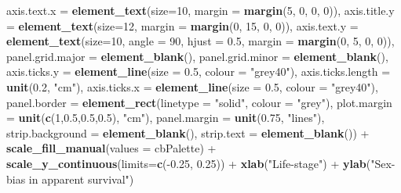 \documentclass[]{article}
\newenvironment{Shaded}{\begin{snugshade}}{\end{snugshade}}
\newcommand{\KeywordTok}[1]{\textcolor[rgb]{0.13,0.29,0.53}{\textbf{{#1}}}}
\newcommand{\DataTypeTok}[1]{\textcolor[rgb]{0.13,0.29,0.53}{{#1}}}
\newcommand{\DecValTok}[1]{\textcolor[rgb]{0.00,0.00,0.81}{{#1}}}
\newcommand{\FloatTok}[1]{\textcolor[rgb]{0.00,0.00,0.81}{{#1}}}
\newcommand{\StringTok}[1]{\textcolor[rgb]{0.31,0.60,0.02}{{#1}}}
\newcommand{\NormalTok}[1]{{#1}}
\begin{document}
\begin{Shaded}
\begin{Highlighting}[]
                      \DataTypeTok{axis.text.x  =} \KeywordTok{element_text}\NormalTok{(}\DataTypeTok{size=}\DecValTok{10}\NormalTok{, }\DataTypeTok{margin =} \KeywordTok{margin}\NormalTok{(}\DecValTok{5}\NormalTok{, }\DecValTok{0}\NormalTok{, }\DecValTok{0}\NormalTok{, }\DecValTok{0}\NormalTok{)), }
                      \DataTypeTok{axis.title.y =} \KeywordTok{element_text}\NormalTok{(}\DataTypeTok{size=}\DecValTok{12}\NormalTok{, }\DataTypeTok{margin =} \KeywordTok{margin}\NormalTok{(}\DecValTok{0}\NormalTok{, }\DecValTok{15}\NormalTok{, }\DecValTok{0}\NormalTok{, }\DecValTok{0}\NormalTok{)),}
                      \DataTypeTok{axis.text.y  =} \KeywordTok{element_text}\NormalTok{(}\DataTypeTok{size=}\DecValTok{10}\NormalTok{, }\DataTypeTok{angle =} \DecValTok{90}\NormalTok{, }\DataTypeTok{hjust =} \FloatTok{0.5}\NormalTok{, }
                                                  \DataTypeTok{margin =} \KeywordTok{margin}\NormalTok{(}\DecValTok{0}\NormalTok{, }\DecValTok{5}\NormalTok{, }\DecValTok{0}\NormalTok{, }\DecValTok{0}\NormalTok{)),}
                      \DataTypeTok{panel.grid.major =} \KeywordTok{element_blank}\NormalTok{(),}
                      \DataTypeTok{panel.grid.minor =} \KeywordTok{element_blank}\NormalTok{(),}
                      \DataTypeTok{axis.ticks.y =} \KeywordTok{element_line}\NormalTok{(}\DataTypeTok{size =} \FloatTok{0.5}\NormalTok{, }\DataTypeTok{colour =} \StringTok{"grey40"}\NormalTok{),}
                      \DataTypeTok{axis.ticks.length =} \KeywordTok{unit}\NormalTok{(}\FloatTok{0.2}\NormalTok{, }\StringTok{"cm"}\NormalTok{),}
                      \DataTypeTok{axis.ticks.x =} \KeywordTok{element_line}\NormalTok{(}\DataTypeTok{size =} \FloatTok{0.5}\NormalTok{, }\DataTypeTok{colour =} \StringTok{"grey40"}\NormalTok{),}
                      \DataTypeTok{panel.border =} \KeywordTok{element_rect}\NormalTok{(}\DataTypeTok{linetype =} \StringTok{"solid"}\NormalTok{, }\DataTypeTok{colour =} \StringTok{"grey"}\NormalTok{),}
                      \DataTypeTok{plot.margin =} \KeywordTok{unit}\NormalTok{(}\KeywordTok{c}\NormalTok{(}\DecValTok{1}\NormalTok{,}\FloatTok{0.5}\NormalTok{,}\FloatTok{0.5}\NormalTok{,}\FloatTok{0.5}\NormalTok{), }\StringTok{"cm"}\NormalTok{),}
                      \DataTypeTok{panel.margin =} \KeywordTok{unit}\NormalTok{(}\FloatTok{0.75}\NormalTok{, }\StringTok{"lines"}\NormalTok{),}
                      \DataTypeTok{strip.background =} \KeywordTok{element_blank}\NormalTok{(), }
                      \DataTypeTok{strip.text =} \KeywordTok{element_blank}\NormalTok{()) +}
\StringTok{                }\KeywordTok{scale_fill_manual}\NormalTok{(}\DataTypeTok{values =} \NormalTok{cbPalette) +}
\StringTok{                }\KeywordTok{scale_y_continuous}\NormalTok{(}\DataTypeTok{limits=}\KeywordTok{c}\NormalTok{(-}\FloatTok{0.25}\NormalTok{, }\FloatTok{0.25}\NormalTok{)) +}
\StringTok{                }\KeywordTok{xlab}\NormalTok{(}\StringTok{"Life-stage"}\NormalTok{) +}
\StringTok{                }\KeywordTok{ylab}\NormalTok{(}\StringTok{"Sex-bias in apparent survival"}\NormalTok{)}
\end{Highlighting}
\end{Shaded}
\end{document}
